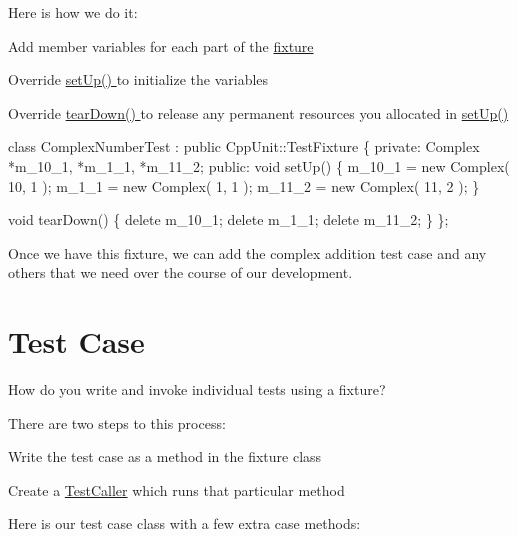 Here is how we do it\+:
\begin{DoxyItemize}
\item Add member variables for each part of the \hyperlink{}{fixture }
\item Override \hyperlink{}{set\+Up() } to initialize the variables
\item Override \hyperlink{}{tear\+Down() } to release any permanent resources you allocated in \hyperlink{}{set\+Up() }
\end{DoxyItemize}


\begin{DoxyCode}
\textcolor{keyword}{class }ComplexNumberTest : \textcolor{keyword}{public} CppUnit::TestFixture \{
\textcolor{keyword}{private}:
  Complex *m\_10\_1, *m\_1\_1, *m\_11\_2;
\textcolor{keyword}{public}:
  \textcolor{keywordtype}{void} setUp()
  \{
    m\_10\_1 = \textcolor{keyword}{new} Complex( 10, 1 );
    m\_1\_1 = \textcolor{keyword}{new} Complex( 1, 1 );
    m\_11\_2 = \textcolor{keyword}{new} Complex( 11, 2 );  
  \}

  \textcolor{keywordtype}{void} tearDown() 
  \{
    \textcolor{keyword}{delete} m\_10\_1;
    \textcolor{keyword}{delete} m\_1\_1;
    \textcolor{keyword}{delete} m\_11\_2;
  \}
\};
\end{DoxyCode}


Once we have this fixture, we can add the complex addition test case and any others that we need over the course of our development.\hypertarget{cppunit_cookbook_test_case}{}\section{Test Case}\label{cppunit_cookbook_test_case}
How do you write and invoke individual tests using a fixture?

There are two steps to this process\+:
\begin{DoxyItemize}
\item Write the test case as a method in the fixture class
\item Create a \hyperlink{class_test_caller}{Test\+Caller} which runs that particular method
\end{DoxyItemize}

Here is our test case class with a few extra case methods\+:


